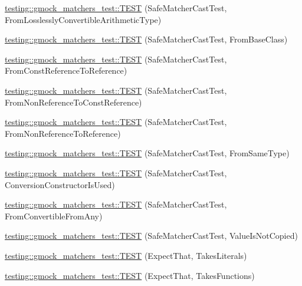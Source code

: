 \begin{DoxyCompactItemize}
\item 
\hyperlink{namespacetesting_1_1gmock__matchers__test_a70bbe53742db988a828d9e8201e34770}{testing\+::gmock\+\_\+matchers\+\_\+test\+::\+T\+E\+ST} (Safe\+Matcher\+Cast\+Test, From\+Losslessly\+Convertible\+Arithmetic\+Type)
\item 
\hyperlink{namespacetesting_1_1gmock__matchers__test_a937469149aee65efde526091af1e4f78}{testing\+::gmock\+\_\+matchers\+\_\+test\+::\+T\+E\+ST} (Safe\+Matcher\+Cast\+Test, From\+Base\+Class)
\item 
\hyperlink{namespacetesting_1_1gmock__matchers__test_a14ba7c67551222321056e4da6708010f}{testing\+::gmock\+\_\+matchers\+\_\+test\+::\+T\+E\+ST} (Safe\+Matcher\+Cast\+Test, From\+Const\+Reference\+To\+Reference)
\item 
\hyperlink{namespacetesting_1_1gmock__matchers__test_ad53741423311d4f76d9d980f59ec8d65}{testing\+::gmock\+\_\+matchers\+\_\+test\+::\+T\+E\+ST} (Safe\+Matcher\+Cast\+Test, From\+Non\+Reference\+To\+Const\+Reference)
\item 
\hyperlink{namespacetesting_1_1gmock__matchers__test_a362ce5b2b395dfd6363e4d80b49951f1}{testing\+::gmock\+\_\+matchers\+\_\+test\+::\+T\+E\+ST} (Safe\+Matcher\+Cast\+Test, From\+Non\+Reference\+To\+Reference)
\item 
\hyperlink{namespacetesting_1_1gmock__matchers__test_a9fc149b429176a45e45267132ae901bd}{testing\+::gmock\+\_\+matchers\+\_\+test\+::\+T\+E\+ST} (Safe\+Matcher\+Cast\+Test, From\+Same\+Type)
\item 
\hyperlink{namespacetesting_1_1gmock__matchers__test_aa608f074e26876d41333cd265c4ca008}{testing\+::gmock\+\_\+matchers\+\_\+test\+::\+T\+E\+ST} (Safe\+Matcher\+Cast\+Test, Conversion\+Constructor\+Is\+Used)
\item 
\hyperlink{namespacetesting_1_1gmock__matchers__test_a0490279eed67f8fa45f83c4951e1d8a1}{testing\+::gmock\+\_\+matchers\+\_\+test\+::\+T\+E\+ST} (Safe\+Matcher\+Cast\+Test, From\+Convertible\+From\+Any)
\item 
\hyperlink{namespacetesting_1_1gmock__matchers__test_ac82f8355af7a1e6ba3b67ba8423a1d73}{testing\+::gmock\+\_\+matchers\+\_\+test\+::\+T\+E\+ST} (Safe\+Matcher\+Cast\+Test, Value\+Is\+Not\+Copied)
\item 
\hyperlink{namespacetesting_1_1gmock__matchers__test_a7672c72f955b937542acd87d18dd7ea6}{testing\+::gmock\+\_\+matchers\+\_\+test\+::\+T\+E\+ST} (Expect\+That, Takes\+Literals)
\item 
\hyperlink{namespacetesting_1_1gmock__matchers__test_aafaf5273bd3d8ba273a5dd243d3a52ba}{testing\+::gmock\+\_\+matchers\+\_\+test\+::\+T\+E\+ST} (Expect\+That, Takes\+Functions)

\end{DoxyCompactItemize}
